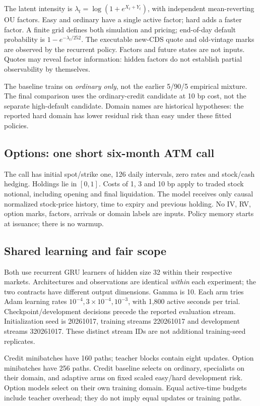 \documentclass[11pt,a4paper]{article}
\begin{document}
The latent intensity is \(\lambda_t=\log(1+e^{X_t+Y_t})\), with independent mean-reverting OU factors. Easy and ordinary have a single active factor; hard adds a faster factor. A finite grid defines both simulation and pricing; end-of-day default probability is \(1-e^{-\lambda_t/252}\). The executable new-CDS quote and old-vintage marks are observed by the recurrent policy. Factors and future states are not inputs. Quotes may reveal factor information: hidden factors do not establish partial observability by themselves.

The baseline trains on \emph{ordinary only}, not the earlier 5/90/5 empirical mixture. The final comparison uses the ordinary-credit candidate at 10 bp cost, not the separate high-default candidate. Domain names are historical hypotheses: the reported hard domain has lower residual risk than easy under these fitted policies.

\subsection*{Options: one short six-month ATM call}
The call has initial spot/strike one, 126 daily intervals, zero rates and stock/cash hedging. Holdings lie in \([0,1]\). Costs of 1, 3 and 10 bp apply to traded stock notional, including opening and final liquidation. The model receives only causal normalized stock-price history, time to expiry and previous holding. No IV, RV, option marks, factors, arrivals or domain labels are inputs. Policy memory starts at issuance; there is no warmup.

\subsection*{Shared learning and fair scope}
Both use recurrent GRU learners of hidden size 32 within their respective markets. Architectures and observations are identical \emph{within} each experiment; the two contracts have different output dimensions. Gamma is 10. Each arm tries Adam learning rates \(10^{-4},3\times10^{-4},10^{-3}\), with 1,800 active seconds per trial. Checkpoint/development decisions precede the reported evaluation stream. Initialization seed is 20261017, training streams 220261017 and development streams 320261017. These distinct stream IDs are not additional training-seed replicates.

Credit minibatches have 160 paths; teacher blocks contain eight updates. Option minibatches have 256 paths. Credit baseline selects on ordinary, specialists on their domain, and adaptive arms on fixed scaled easy/hard development risk. Option models select on their own training domain. Equal active-time budgets include teacher overhead; they do not imply equal updates or training paths.
\end{document}
